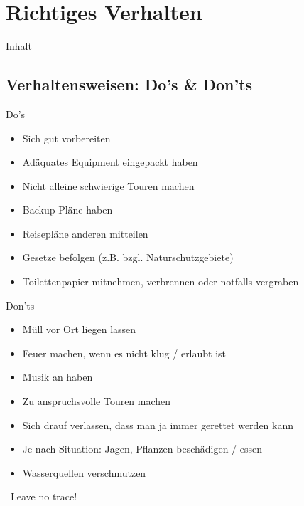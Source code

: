\documentclass{beamer}
\begin{document}
	\section{Richtiges Verhalten}
		
		\begin{frame}[t]{Inhalt}
		\end{frame}
		
		\subsection{Verhaltensweisen: Do's \& Don'ts}
			
			\begin{frame}{Do's}
				\begin{itemize}
					\item Sich gut vorbereiten
					\item Adäquates Equipment eingepackt haben
					\item Nicht alleine schwierige Touren machen
					\item Backup-Pläne haben
					\item Reisepläne anderen mitteilen
					\item Gesetze befolgen (z.B. bzgl. Naturschutzgebiete)
					\item Toilettenpapier mitnehmen, verbrennen oder notfalls vergraben
				\end{itemize}
			\end{frame}
			
			\begin{frame}{Don'ts}
				\begin{itemize}
					\item Müll vor Ort liegen lassen
					\item Feuer machen, wenn es nicht klug / erlaubt ist
					\item Musik an haben
					\item Zu anspruchsvolle Touren machen
					\item Sich drauf verlassen, dass man ja immer gerettet werden kann
					\item Je nach Situation: Jagen, Pflanzen beschädigen / essen
					\item Wasserquellen verschmutzen
				\end{itemize}
				\pause
				\vspace{0.2cm}
				\textcolor{blue}{\textrightarrow}\ Leave no trace!
			\end{frame}
			
\end{document}

